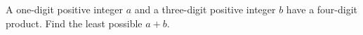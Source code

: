 A one-digit positive integer $ a $ and a three-digit positive integer $ b $ have a four-digit product. Find the least possible $ a+b $.

